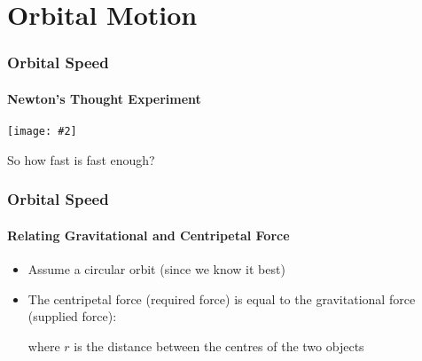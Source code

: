 \documentclass[12pt,compress,aspectratio=169]{beamer}
\newcommand{\pic}[2]{\texttt{[image: \#2]}}
\begin{document}
\section{Orbital Motion}

\begin{frame}
  \frametitle{Orbital Speed}
  \framesubtitle{Newton's Thought Experiment}
  \begin{center}
    \pic{1}{figure-5.jpg}
  \end{center}

  \vspace{-.3in}So how fast is fast enough?
\end{frame}


\begin{frame}
  \frametitle{Orbital Speed}
  \framesubtitle{Relating Gravitational and Centripetal Force}
  \begin{itemize}
  \item Assume a circular orbit (since we know it best)
  \item The centripetal force (required force) is equal to the gravitational
    force (supplied force):

    where $r$ is the distance between the centres of the two objects
  \end{itemize}
\end{frame}
\end{document}

